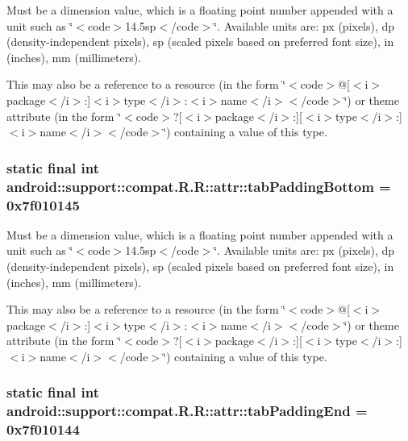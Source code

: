 Must be a dimension value, which is a floating point number appended with a unit such as \char`\"{}$<$code$>$14.5sp$<$/code$>$\char`\"{}. Available units are: px (pixels), dp (density-independent pixels), sp (scaled pixels based on preferred font size), in (inches), mm (millimeters). 

This may also be a reference to a resource (in the form \char`\"{}$<$code$>$@\mbox{[}$<$i$>$package$<$/i$>$:\mbox{]}$<$i$>$type$<$/i$>$:$<$i$>$name$<$/i$>$$<$/code$>$\char`\"{}) or theme attribute (in the form \char`\"{}$<$code$>$?\mbox{[}$<$i$>$package$<$/i$>$:\mbox{]}\mbox{[}$<$i$>$type$<$/i$>$:\mbox{]}$<$i$>$name$<$/i$>$$<$/code$>$\char`\"{}) containing a value of this type. \hypertarget{classandroid_1_1support_1_1compat_1_1_r_1_1attr_32463d9e46ff24c9c5934e426e0e6dd0}{
\subsubsection[{tabPaddingBottom}]{\setlength{\rightskip}{0pt plus 5cm}static final int android::support::compat.R.R::attr::tabPaddingBottom = 0x7f010145}}
\label{classandroid_1_1support_1_1compat_1_1_r_1_1attr_32463d9e46ff24c9c5934e426e0e6dd0}


Must be a dimension value, which is a floating point number appended with a unit such as \char`\"{}$<$code$>$14.5sp$<$/code$>$\char`\"{}. Available units are: px (pixels), dp (density-independent pixels), sp (scaled pixels based on preferred font size), in (inches), mm (millimeters). 

This may also be a reference to a resource (in the form \char`\"{}$<$code$>$@\mbox{[}$<$i$>$package$<$/i$>$:\mbox{]}$<$i$>$type$<$/i$>$:$<$i$>$name$<$/i$>$$<$/code$>$\char`\"{}) or theme attribute (in the form \char`\"{}$<$code$>$?\mbox{[}$<$i$>$package$<$/i$>$:\mbox{]}\mbox{[}$<$i$>$type$<$/i$>$:\mbox{]}$<$i$>$name$<$/i$>$$<$/code$>$\char`\"{}) containing a value of this type. \hypertarget{classandroid_1_1support_1_1compat_1_1_r_1_1attr_753176b2939873e92d02262d06bd8a47}{
\subsubsection[{tabPaddingEnd}]{\setlength{\rightskip}{0pt plus 5cm}static final int android::support::compat.R.R::attr::tabPaddingEnd = 0x7f010144}}
\label{classandroid_1_1support_1_1compat_1_1_r_1_1attr_753176b2939873e92d02262d06bd8a47}


